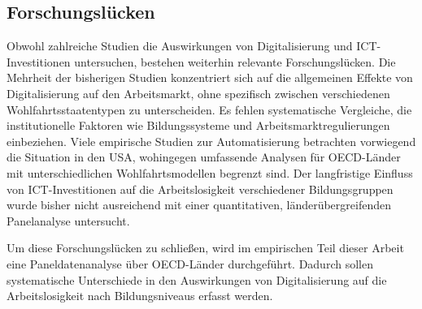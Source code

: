 
\subsection{Forschungslücken}

Obwohl zahlreiche Studien die Auswirkungen von Digitalisierung und \ac{ICT}-Investitionen 
untersuchen, bestehen weiterhin relevante Forschungslücken. Die Mehrheit der bisherigen Studien 
konzentriert sich auf die allgemeinen Effekte von Digitalisierung auf den Arbeitsmarkt, ohne 
spezifisch zwischen verschiedenen Wohlfahrtsstaatentypen zu unterscheiden. Es fehlen 
systematische Vergleiche, die institutionelle Faktoren wie Bildungssysteme und 
Arbeitsmarktregulierungen einbeziehen. Viele empirische Studien zur Automatisierung betrachten 
vorwiegend die Situation in den USA, wohingegen umfassende Analysen für \ac{OECD}-Länder mit 
unterschiedlichen Wohlfahrtsmodellen begrenzt sind. Der langfristige Einfluss von 
\ac{ICT}-Investitionen auf die Arbeitslosigkeit verschiedener Bildungsgruppen wurde bisher nicht 
ausreichend mit einer quantitativen, länderübergreifenden Panelanalyse untersucht.

Um diese Forschungslücken zu schließen, wird im empirischen Teil dieser Arbeit eine 
Paneldatenanalyse über \ac{OECD}-Länder durchgeführt. Dadurch sollen systematische Unterschiede 
in den Auswirkungen von Digitalisierung auf die Arbeitslosigkeit nach Bildungsniveaus erfasst 
werden.
